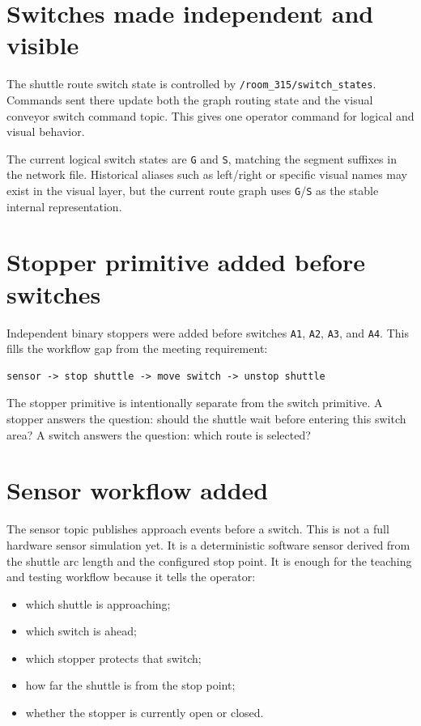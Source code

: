 \documentclass[12pt,a4paper]{report}
\begin{document}
\section{Switches made independent and visible}

The shuttle route switch state is controlled by
\texttt{/room\_315/switch\_states}. Commands sent there update both the graph
routing state and the visual conveyor switch command topic. This gives one
operator command for logical and visual behavior.

The current logical switch states are \texttt{G} and \texttt{S}, matching the
segment suffixes in the network file. Historical aliases such as left/right or
specific visual names may exist in the visual layer, but the current route graph
uses \texttt{G}/\texttt{S} as the stable internal representation.

\section{Stopper primitive added before switches}

Independent binary stoppers were added before switches \texttt{A1},
\texttt{A2}, \texttt{A3}, and \texttt{A4}. This fills the workflow gap from the
meeting requirement:

\begin{lstlisting}[style=terminalcode]
sensor -> stop shuttle -> move switch -> unstop shuttle
\end{lstlisting}

The stopper primitive is intentionally separate from the switch primitive. A
stopper answers the question: should the shuttle wait before entering this
switch area? A switch answers the question: which route is selected?

\section{Sensor workflow added}

The sensor topic publishes approach events before a switch. This is not a full
hardware sensor simulation yet. It is a deterministic software sensor derived
from the shuttle arc length and the configured stop point. It is enough for the
teaching and testing workflow because it tells the operator:

\begin{itemize}
\item which shuttle is approaching;
\item which switch is ahead;
\item which stopper protects that switch;
\item how far the shuttle is from the stop point;
\item whether the stopper is currently open or closed.
\end{itemize}
\end{document}
